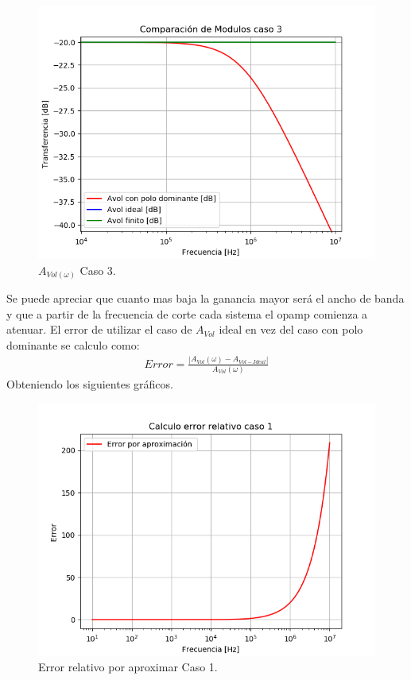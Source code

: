 \begin{figure}[H]	
	\centering
	\includegraphics[width=\textwidth]{Ejercicio1/Imagenes/HCompC3.png}
	\caption{$A_{Vol(\omega)}$ Caso 3.}
	\label{fig:AvolC3}
\end{figure}
Se puede apreciar que cuanto mas baja la ganancia mayor será el ancho de banda y que a partir de la frecuencia de corte cada sistema el opamp comienza a atenuar.
El error de utilizar el caso de $A_{Vol}$ ideal en vez del caso con polo dominante se calculo como:
\begin{align}
	Error = \frac{|A_{Vol}(\omega)-A_{Vol-Ideal}|}{A_{Vol}(\omega)}
\end{align}
Obteniendo los siguientes gráficos.
\begin{figure}[H]	
	\centering
	\includegraphics[width=\textwidth]{Ejercicio1/Imagenes/error1.png}
	\caption{Error relativo por aproximar Caso 1.}
	\label{fig:e1}
\end{figure}
